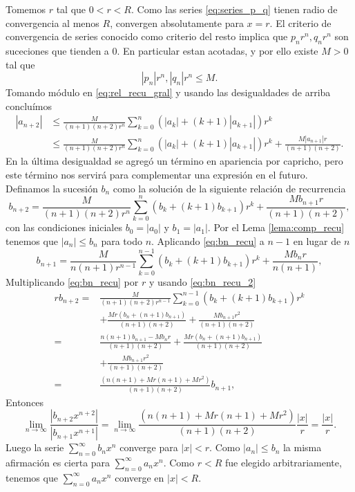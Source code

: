 \begin{demo}
Tomemos $r$ tal que $0<r<R$. Como las series \eqref{eq:series_p_q} tienen radio de convergencia al menos  $R$,  convergen absolutamente para $x=r$. El criterio de convergencia de series conocido como criterio del resto implica que $p_nr^n,q_nr^n$ son suceciones que tienden a $0$. En particular estan acotadas, y por ello existe $M>0$ tal que
\[ |p_n|r^n,|q_n|r^n\leq M.\]
Tomando módulo en \eqref{eq:rel_recu_gral} y usando las desigualdades de arriba concluímos
\[
  \begin{split}
    |a_{n+2}|&\leq\frac{M}{(n+1)(n+2)r^n} \sum_{k=0}^n\left(|a_k|+ (k+1)|a_{k+1}|\right)r^k\\
&\leq\frac{M}{(n+1)(n+2)r^n} \sum_{k=0}^n\left(|a_k|+ (k+1)|a_{k+1}|\right)r^k+\frac{M|a_{n+1}|r}{(n+1)(n+2)}.
  \end{split}
  \]
En la última desigualdad se agregó un término en apariencia por capricho, pero este término nos servirá para complementar una expresión en el futuro. Definamos la sucesión $b_n$ como la solución de la siguiente relación de recurrencia
\begin{equation}\label{eq:bn_recu}b_{n+2}=\frac{M}{(n+1)(n+2)r^n} \sum_{k=0}^n\left(b_k+ (k+1)b_{k+1}\right)r^k+\frac{Mb_{n+1}r}{(n+1)(n+2)},
\end{equation}
con las condiciones iniciales $b_0=|a_0|$ y $b_1=|a_1|$. Por el Lema \ref{lema:comp_recu} tenemos que $|a_n|\leq b_n$ para todo $n$. Aplicando \eqref{eq:bn_recu} a $n-1$ en lugar de $n$
\begin{equation}\label{eq:bn_recu_2}b_{n+1}=\frac{M}{n(n+1)r^{n-1}} \sum_{k=0}^{n-1}\left(b_k+ (k+1)b_{k+1}\right)r^k+\frac{Mb_{n}r}{n(n+1)},
\end{equation}
Multiplicando  \eqref{eq:bn_recu} por $r$ y usando \ref{eq:bn_recu_2}
\[
\begin{split}
rb_{n+2}=&\frac{M}{(n+1)(n+2)r^{n-1}} \sum_{k=0}^{n-1}\left(b_k+ (k+1)b_{k+1}\right)r^k\\
&+\frac{Mr\left(b_n+ (n+1)b_{n+1}\right)}{(n+1)(n+2)}+\frac{Mb_{n+1}r^2}{(n+1)(n+2)}\\
=&\frac{n(n+1)b_{n+1}-Mb_nr}{(n+1)(n+2)}
+\frac{Mr\left(b_n+ (n+1)b_{n+1}\right)}{(n+1)(n+2)}\\
&+\frac{Mb_{n+1}r^2}{(n+1)(n+2)}\\
=&\frac{(n(n+1)+Mr(n+1)+Mr^2)}{(n+1)(n+2)}b_{n+1},
\end{split}
\]
Entonces
\[\lim_{n\to\infty}\frac{|b_{n+2}x^{n+2}|}{|b_{n+1}x^{n+1}|}=\lim_{n\to\infty}\frac{(n(n+1)+Mr(n+1)+Mr^2)}{(n+1)(n+2)}\frac{|x|}{r}=\frac{|x|}{r}.
\]
Luego la serie $\sum_{n=0}^{\infty}b_nx^n$ converge para $|x|<r$. Como $|a_n|\leq b_n$ la misma afirmación es cierta para $\sum_{n=0}^{\infty}a_nx^n$. Como $r<R$ fue elegido arbitrariamente, tenemos que $\sum_{n=0}^{\infty}a_nx^n$ converge en $|x|<R$.
\end{demo}


